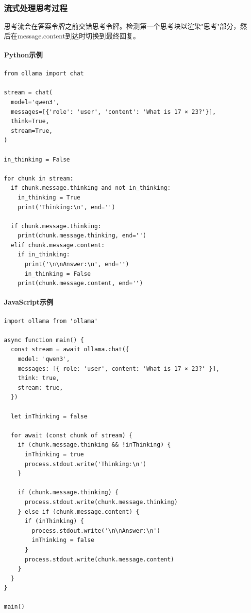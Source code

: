 \documentclass[12pt,UTF8]{ctexbook}
\begin{document}
\subsubsection{流式处理思考过程}
思考流会在答案令牌之前交错思考令牌。检测第一个思考块以渲染"思考"部分，然后在message.content到达时切换到最终回复。

\paragraph{Python示例}
\begin{verbatim}
from ollama import chat

stream = chat(
  model='qwen3',
  messages=[{'role': 'user', 'content': 'What is 17 × 23?'}],
  think=True,
  stream=True,
)

in_thinking = False

for chunk in stream:
  if chunk.message.thinking and not in_thinking:
    in_thinking = True
    print('Thinking:\n', end='')

  if chunk.message.thinking:
    print(chunk.message.thinking, end='')
  elif chunk.message.content:
    if in_thinking:
      print('\n\nAnswer:\n', end='')
      in_thinking = False
    print(chunk.message.content, end='')
\end{verbatim}

\paragraph{JavaScript示例}
\begin{verbatim}
import ollama from 'ollama'

async function main() {
  const stream = await ollama.chat({
    model: 'qwen3',
    messages: [{ role: 'user', content: 'What is 17 × 23?' }],
    think: true,
    stream: true,
  })

  let inThinking = false

  for await (const chunk of stream) {
    if (chunk.message.thinking && !inThinking) {
      inThinking = true
      process.stdout.write('Thinking:\n')
    }

    if (chunk.message.thinking) {
      process.stdout.write(chunk.message.thinking)
    } else if (chunk.message.content) {
      if (inThinking) {
        process.stdout.write('\n\nAnswer:\n')
        inThinking = false
      }
      process.stdout.write(chunk.message.content)
    }
  }
}

main()
\end{verbatim}
\end{document}
